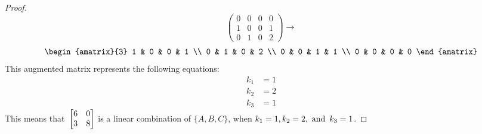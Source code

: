 \begin{enumerate}
\begin{proof}
\[\begin{pmatrix}
        0 & 0 & 0 & 0 \\
        1 & 0 & 0 & 1 \\
        0 & 1 & 0 & 2
      \end{pmatrix} \rightarrow
    \]
    \[
      \begin{amatrix}{3}
        1 & 0 & 0 & 1 \\
        0 & 1 & 0 & 2 \\
        0 & 0 & 1 & 1 \\
        0 & 0 & 0 & 0
      \end{amatrix}
    \]
    This augmented matrix represents the following equations:
    \begin{align*}
      k_1 & = 1 \\
      k_2 & = 2 \\
      k_3 & = 1
    \end{align*}
    This means that $\operatorname{\displaystyle} \begin{bmatrix} 6 & 0 \\ 3 & 8 \end{bmatrix}$ is a linear combination of $\{A,B,C\}$, when $k_1 = 1, k_2 = 2, \operatorname{~\text{and}~} k_3 = 1$.
  \end{proof}

\end{enumerate}

